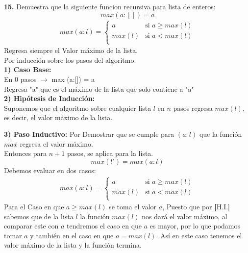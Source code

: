 \textbf{15.} Demuestra que la siguiente funcion recursiva para lista de enteros: \\
\[
max (a:[]) = a
\]
\begin{align*}
max (a:l) = \begin{cases}
    a & \text{si } a \geq max(l) \\
    max(l) & \text{si } a < max(l) \\
\end{cases}
\end{align*}
\newline
Regresa siempre el Valor máximo de la lista.\\
\newline 
Por inducción sobre los pasos del algoritmo. \\
\newline
\textbf{1) Caso Base:}\\
\newline
En 0 pasos $\rightarrow$ max (a:[]) = a \\
Regresa "a" que es el máximo de la lista que solo contiene a "a" \\
\newline
\textbf{2) Hipótesis de Inducción:} \\
\newline
Suponemos que el algoritmo sobre cualquier lista $l$ en $n$ pasos regresa $max(l)$, es decir, el valor máximo de la lista. \\
\newline

\textbf{3) Paso Inductivo:} Por Demostrar que se cumple  para $(a:l)$ que la función $max$ regresa el valor máximo.\\
Entonces para $n+1$  pasos, se aplica para la lista.
\[
max(l') = max(a:l)
\]
Debemos evaluar en dos casos:
\begin{align*}
max (a:l) = \begin{cases}
    a & \text{si } a \geq max(l) \\
    max(l) & \text{si } a < max(l) \\
\end{cases}
\end{align*}
Para el Caso en que $a \geq max(l)$ se toma el valor $a$, Puesto que por \textbf[H.I.] sabemos que de la lista $l$ la función $max(l)$ nos dará el valor máximo, al comparar este con $a$ tendremos el caso en que $a$ es mayor, por lo que podamos tomar $a$ y también en el caso en que $a = max(l)$. Así en este caso tenemos el valor máximo de la lista y la función termina. \\
\newline


